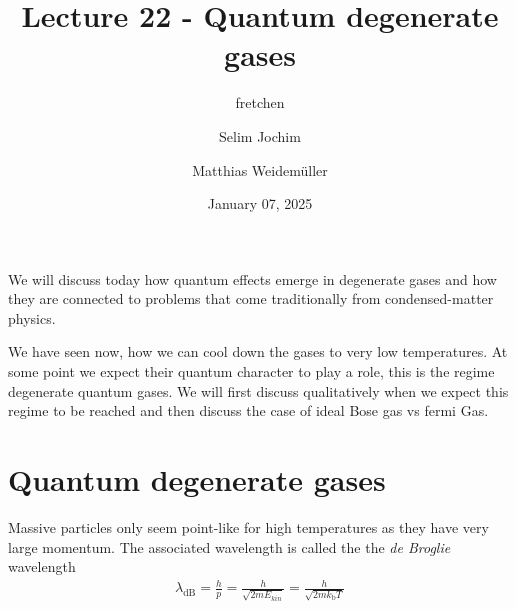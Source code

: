 \documentclass[10pt]{article}
\renewenvironment{abstract}
  {{\bfseries\noindent{\abstractname}\par\nobreak}\footnotesize}
  {\bigskip}
\begin{document}
\title{Lecture 22 - Quantum degenerate gases}



\author[1]{fretchen}%
\author[2]{Selim Jochim}%
\author[2]{Matthias Weidemüller}%
%
%


\vspace{-1em}



  
  \date{January 07, 2025}


\begingroup
\let\center\flushleft
\let\endcenter\endflushleft
\maketitle
\endgroup





\begin{abstract}
We will discuss today how quantum effects emerge in degenerate gases and how they are connected to problems that come traditionally from condensed-matter physics.%
\end{abstract}%



\sloppy


We have seen now, how we can cool down the gases to very low temperatures. At some point we expect their quantum character to play a role, this is the regime degenerate quantum gases. We will first discuss qualitatively when we expect this regime to be reached and then discuss the case of ideal Bose gas vs fermi Gas.

\section{Quantum degenerate gases}
Massive particles only seem point-like for high temperatures as they have very large momentum. The associated wavelength is called the the \textit{de Broglie} wavelength
%
\begin{align}
\lambda_\text{dB} = \frac{h}{p} = \frac{h}{\sqrt{2mE_{kin}}} = \frac{h}{\sqrt{2mk_\textrm{b}T}}
\end{align}
\end{document}
